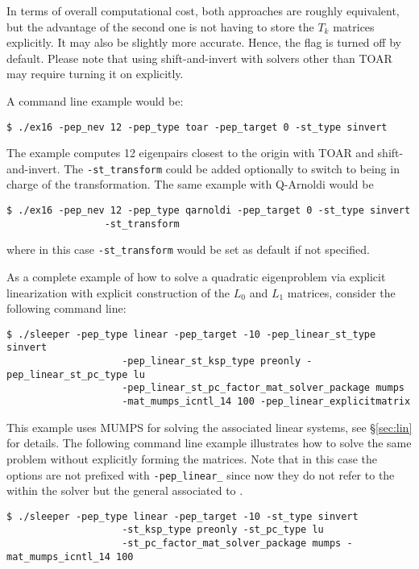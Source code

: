 In terms of overall computational cost, both approaches are roughly equivalent, but the advantage of the second one is not having to store the $T_k$ matrices explicitly. It may also be slightly more accurate. Hence, the  flag is turned off by default. Please note that using shift-and-invert with solvers other than TOAR may require turning it on explicitly.

A command line example would be:
	\begin{Verbatim}[fontsize=\small]
	$ ./ex16 -pep_nev 12 -pep_type toar -pep_target 0 -st_type sinvert
	\end{Verbatim}
The example computes 12 eigenpairs closest to the origin with TOAR and shift-and-invert. The \Verb!-st_transform! could be added optionally to switch to  being in charge of the transformation. The same example with Q-Arnoldi would be
	\begin{Verbatim}[fontsize=\small]
	$ ./ex16 -pep_nev 12 -pep_type qarnoldi -pep_target 0 -st_type sinvert
                 -st_transform
	\end{Verbatim}
where in this case \Verb!-st_transform! would be set as default if not specified.

As a complete example of how to solve a quadratic eigenproblem via explicit linearization with explicit construction of the $L_0$ and $L_1$ matrices, consider the following command line:
\begin{Verbatim}[fontsize=\small]
	$ ./sleeper -pep_type linear -pep_target -10 -pep_linear_st_type sinvert
                    -pep_linear_st_ksp_type preonly -pep_linear_st_pc_type lu
                    -pep_linear_st_pc_factor_mat_solver_package mumps
                    -mat_mumps_icntl_14 100 -pep_linear_explicitmatrix
\end{Verbatim}
This example uses MUMPS for solving the associated linear systems, see \S\ref{sec:lin} for details. The following command line example illustrates how to solve the same problem without explicitly forming the matrices. Note that in this case the  options are not prefixed with \texttt{-pep\_linear\_} since now they do not refer to the  within the  solver but the general  associated to .
\begin{Verbatim}[fontsize=\small]
	$ ./sleeper -pep_type linear -pep_target -10 -st_type sinvert
                    -st_ksp_type preonly -st_pc_type lu
                    -st_pc_factor_mat_solver_package mumps -mat_mumps_icntl_14 100
\end{Verbatim}

